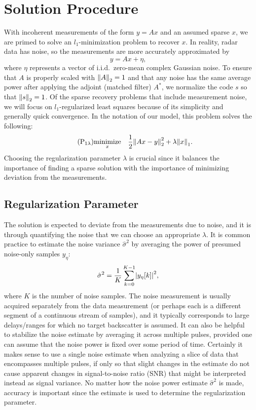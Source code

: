 \section{Solution Procedure}
\label{waveform_inversion_solution}
With incoherent measurements of the form $y=Ax$ and an assumed sparse $x$, we are primed to solve an $l_1$-minimization problem to recover $x$. In reality, radar data has noise, so the measurements are more accurately approximated by
\begin{equation}
 y = Ax + \eta,
\end{equation}
where $\eta$ represents a vector of i.i.d.\ zero-mean complex Gaussian noise. To ensure that $A$ is properly scaled with $\norm{2}{A} = 1$ and that any noise has the same average power after applying the adjoint (matched filter) $A^*$, we normalize the code $s$ so that $\norm{2}{s} = 1$. Of the sparse recovery problems that include measurement noise, we will focus on $l_1$-regularized least squares because of its simplicity and generally quick convergence. In the notation of our model, this problem solves the following:
\begin{equation*}\tag{$\text{P}_{\text{1}\lambda}$}
 \underset{x}{\mathrm{minimize}} \quad \frac{1}{2}\norm{2}{Ax - y}^2 + \lambda\norm{1}{x}.
\end{equation*}
Choosing the regularization parameter $\lambda$ is crucial since it balances the importance of finding a sparse solution with the importance of minimizing deviation from the measurements.

\subsection{Regularization Parameter}
The solution is expected to deviate from the measurements due to noise, and it is through quantifying the noise that we can choose an appropriate $\lambda$. It is common practice to estimate the noise variance $\hat{\sigma}^2$ by averaging the power of presumed noise-only samples $y_\eta$:
\begin{equation}
 \hat{\sigma}^2 = \frac{1}{K} \sum_{k=0}^{K-1} \abs*{y_{\eta}[k]}^2,
\end{equation}
where $K$ is the number of noise samples. The noise measurement is usually acquired separately from the data measurement (or perhaps each is a different segment of a continuous stream of samples), and it typically corresponds to large delays/ranges for which no target backscatter is assumed. It can also be helpful to stabilize the noise estimate by averaging it across multiple pulses, provided one can assume that the noise power is fixed over some period of time. Certainly it makes sense to use a single noise estimate when analyzing a slice of data that encompasses multiple pulses, if only so that slight changes in the estimate do not cause apparent changes in signal-to-noise ratio (SNR) that might be interpreted instead as signal variance. No matter how the noise power estimate $\hat{\sigma}^2$ is made, accuracy is important since the estimate is used to determine the regularization parameter.

